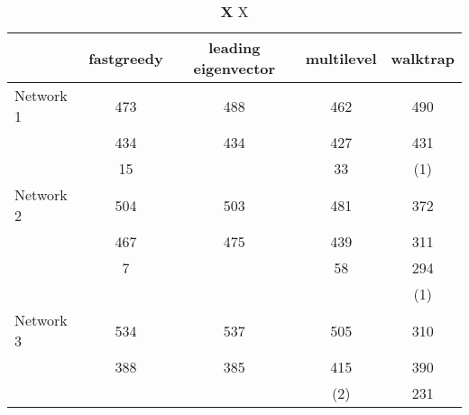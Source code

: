 \begin{table}[htbp]
\centering
\caption[X]{\textbf{X} X\\
}
\label{tab:algos4}

\begin{tabular}{lcccc}
\toprule
	 {} &
	 fastgreedy &
	 leading eigenvector &
	 multilevel &
	 walktrap \\ \midrule
	 
	  Network 1
	  & 473 & 488 & 462 & 490 \\
	  & 434 & 434 & 427 & 431 \\
	  & 15 &   & 33 & (1) \\ \midrule
	  Network 2
	  & 504 & 503 & 481 & 372 \\
	  & 467 & 475 & 439 & 311 \\
	  & 7 &   &  58 & 294 \\
	  & & & & (1) \\ \midrule
	  Network 3
	  & 534 & 537 & 505 & 310 \\
	  & 388 & 385 & 415 & 390 \\
	  &  &   &  (2) & 231 \\
	 \bottomrule
	 
\end{tabular}

\end{table}

